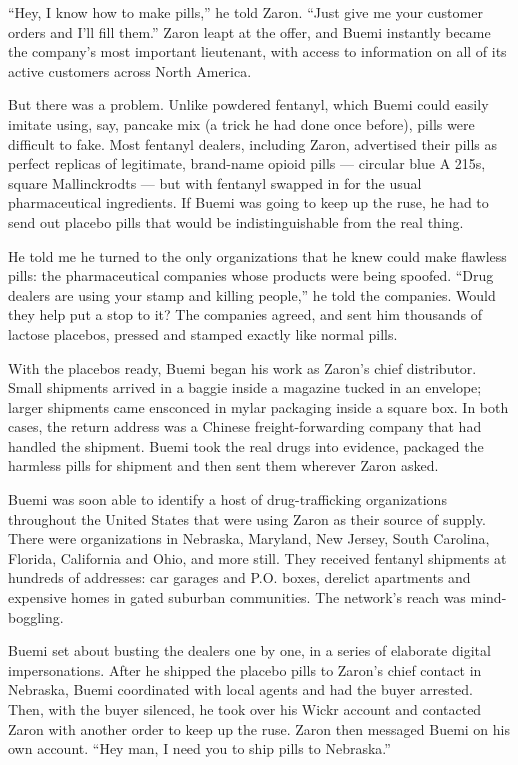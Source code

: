 ``Hey, I know how to make pills,'' he told Zaron. ``Just give me your
customer orders and I'll fill them.'' Zaron leapt at the offer, and
Buemi instantly became the company's most important lieutenant, with
access to information on all of its active customers across North
America.

But there was a problem. Unlike powdered fentanyl, which Buemi could
easily imitate using, say, pancake mix (a trick he had done once
before), pills were difficult to fake. Most fentanyl dealers, including
Zaron, advertised their pills as perfect replicas of legitimate,
brand-name opioid pills --- circular blue A 215s, square Mallinckrodts
--- but with fentanyl swapped in for the usual pharmaceutical
ingredients. If Buemi was going to keep up the ruse, he had to send out
placebo pills that would be indistinguishable from the real thing.

He told me he turned to the only organizations that he knew could make
flawless pills: the pharmaceutical companies whose products were being
spoofed. ``Drug dealers are using your stamp and killing people,'' he
told the companies. Would they help put a stop to it? The companies
agreed, and sent him thousands of lactose placebos, pressed and stamped
exactly like normal pills.

With the placebos ready, Buemi began his work as Zaron's chief
distributor. Small shipments arrived in a baggie inside a magazine
tucked in an envelope; larger shipments came ensconced in mylar
packaging inside a square box. In both cases, the return address was a
Chinese freight-forwarding company that had handled the shipment. Buemi
took the real drugs into evidence, packaged the harmless pills for
shipment and then sent them wherever Zaron asked.

Buemi was soon able to identify a host of drug-trafficking organizations
throughout the United States that were using Zaron as their source of
supply. There were organizations in Nebraska, Maryland, New Jersey,
South Carolina, Florida, California and Ohio, and more still. They
received fentanyl shipments at hundreds of addresses: car garages and
P.O. boxes, derelict apartments and expensive homes in gated suburban
communities. The network's reach was mind-boggling.

Buemi set about busting the dealers one by one, in a series of elaborate
digital impersonations. After he shipped the placebo pills to Zaron's
chief contact in Nebraska, Buemi coordinated with local agents and had
the buyer arrested. Then, with the buyer silenced, he took over his
Wickr account and contacted Zaron with another order to keep up the
ruse. Zaron then messaged Buemi on his own account. ``Hey man, I need
you to ship pills to Nebraska.''

